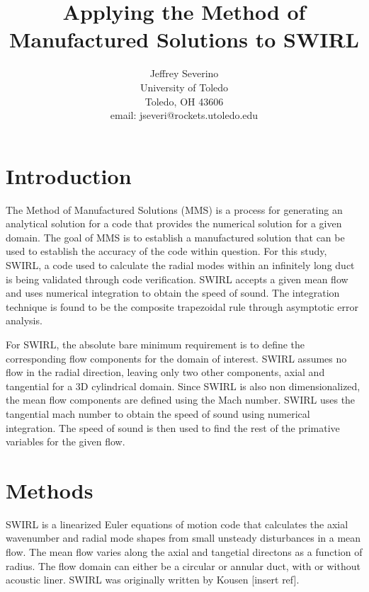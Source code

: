 \documentclass[a4paper]{report}
\begin{document}
\begin{titlepage}

    \title{ Applying the Method of Manufactured Solutions to SWIRL}
    

    \author{ Jeffrey Severino \\
        University of Toledo \\
        Toledo, OH  43606 \\
    email: jseveri@rockets.utoledo.edu}


    \maketitle

\end{titlepage}
\section{Introduction}
The Method of Manufactured Solutions (MMS) is a process for generating an 
analytical solution for a code that provides the numerical solution for a 
given domain. The goal of MMS is to establish a manufactured solution that can 
be used to establish the accuracy of the code within question. For this study, 
SWIRL, a code used to calculate the radial modes within an infinitely long duct
is being validated through code verification. SWIRL accepts a given mean flow and 
uses numerical integration to obtain the speed of sound. The integration technique
is found to be the composite trapezoidal rule through asymptotic error analysis.

For SWIRL, the absolute bare minimum requirement is to define the corresponding
flow components for the domain of interest. SWIRL assumes no flow in the radial 
direction, leaving only two other components, axial and tangential for a 3D 
cylindrical domain. Since SWIRL is also non dimensionalized, the mean flow 
components are defined using the Mach number. SWIRL uses the tangential mach number
to obtain the speed of sound using numerical integration. The speed of sound
is then used to find the rest of the primative variables for the given flow. 

\section{Methods}

SWIRL is a linearized Euler equations of motion code that calculates the 
axial wavenumber and radial mode shapes from small unsteady disturbances in a mean flow. 
The mean flow varies along the axial and tangetial directons as a function of 
radius. The flow domain can either be a circular or annular duct, with or without
acoustic liner. SWIRL was originally written by Kousen [insert ref].
\end{document}

